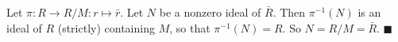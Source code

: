 Let $\pi : R \to R/M : r \mapsto \bar{r}$. Let $N$ be a nonzero ideal of $\bar{R}$. Then $\pi^{-1}(N)$ is an ideal of $R$ (strictly) containing $M$, so that $\pi^{-1}(N)=R$. So $N= R/M = \bar{R}$. 
 $\blacksquare$